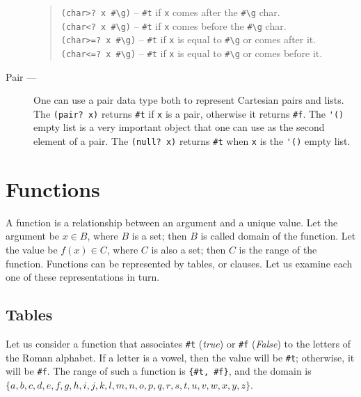 \documentclass[a4paper,12pt]{book}
\begin{document}
\begin{description}
\begin{quote}
			\verb|(char>? x #\g)| -- \verb|#t| if \verb|x| comes
			after the \verb|#\g| char.\\
			\verb|(char<? x #\g)| -- \verb|#t| if \verb|x| comes
			before the \verb|#\g| char.\\
			\verb|(char>=? x #\g)| -- \verb|#t| if \verb|x| is
			equal to \verb|#\g| or comes after it.\\
			\verb|(char<=? x #\g)| -- \verb|#t| if \verb|x| is
			equal to \verb|#\g| or comes before it.\\
		\end{quote}
	\item[Pair ---] One can use a pair data type
		both to represent Cartesian pairs and lists.
		The \verb|(pair? x)| returns \verb|#t| if
		\verb|x| is a pair,
		otherwise it returns \verb|#f|.
		The \verb|'()| empty list is a very important
		object that one can use as the second element
		of a pair. The \verb|(null? x)| returns \verb|#t|
		when \verb|x| is the \verb|'()| empty list.
\end{description}


\section{Functions}
A function is a relationship between an argument and a unique value.
Let the argument be $x\in B$, where $B$ is a set; then $B$ is called
domain of the function. Let the value be $f(x)\in C$, where $C$ is
also a set; then $C$ is the range of the function.
Functions can be represented by tables, or clauses. Let us examine
each one of these representations in turn.

\subsection*{Tables}
Let us consider a function that associates \verb|#t| ({\em true})
or \verb|#f| ({\em False}) to the
letters of the Roman alphabet. If a letter is a vowel,
then the value will be \verb|#t|; otherwise, 
it will be \verb|#f|. The range of such a function
is \verb|{#t, #f}|, and the domain is
$\{a,b,c,d,e,f,g,h,i,j,k,l,m,n,o,p,q,r,s,t,u,v,w,x,y,z\}$.\\
\end{document}
